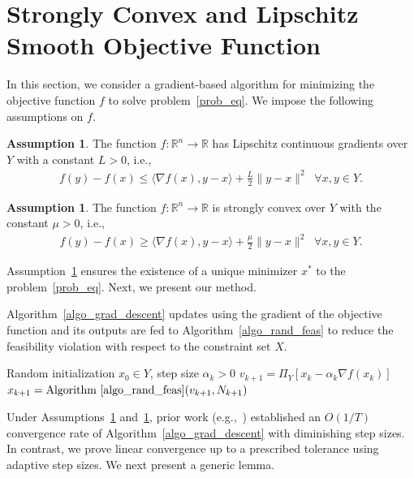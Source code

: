 \documentclass{article}
\def\la{\langle}
\def\ra{\rangle}
\def\a{\alpha}
\def\re{\mathbb{R}}
\theoremstyle{plain}
\theoremstyle{definition}
\newtheorem{assumption}[theorem]{Assumption}
\theoremstyle{remark}
\begin{document}

\section{Strongly Convex and Lipschitz Smooth Objective Function}\label{sec:StrongConvex}

In this section, we consider a gradient-based algorithm for minimizing the objective function $f$ to solve problem~\eqref{prob_eq}. We impose the following assumptions on $f$.
%
%
\begin{assumption}\label{asum_lipschitz}
    The function $f:\re^n\to\re$ has Lipschitz continuous gradients over $Y$ with a constant $L>0$, i.e.,
   \begin{align}
       f(y)-f(x)\le \la \nabla f(x),y-x\ra+\frac{L}{2}\|y-x\|^2 \;\; \forall x,y\in Y. \nonumber
   \end{align}
\end{assumption}
%
%
\begin{assumption}\label{asum_strong_convex}
    The function $f:\re^n\to\re$ is strongly convex
   over $Y$ with the constant $\mu>0$, i.e.,
   \begin{align}
       f(y)-f(x)\ge \la \nabla f(x),y-x\ra+\frac{\mu}{2}\|y-x\|^2 \;\; \forall x, y \in Y . \nonumber
   \end{align}
\end{assumption}
%
%
Assumption~\ref{asum_strong_convex} ensures the existence of a unique minimizer $x^*$ to the problem~\eqref{prob_eq}. Next, we present our method.

Algorithm~\ref{algo_grad_descent} updates using the gradient of the objective function and its outputs are fed to Algorithm~\ref{algo_rand_feas} to reduce the feasibility violation with respect to the constraint set $X$. 
%
%
\begin{algorithm}
\caption{Gradient Method with Randomized Feasibility}
\label{algo_grad_descent}
\begin{algorithmic}[1]
\REQUIRE Random initialization $x_0 \in Y$, step size $\a_k > 0$
    \STATE $v_{k+1} = \Pi_Y[x_k - \a_k \nabla f(x_k)]$
    \STATE $x_{k+1} = \text{Algorithm~\ref{algo_rand_feas}}(v_{k+1}, N_{k+1})$
\ENDFOR
\end{algorithmic}
\end{algorithm}
%
Under Assumptions~\ref{asum_lipschitz} and~\ref{asum_strong_convex}, prior work (e.g.,~\cite{nedic2019random}) established an $O(1/T)$ convergence rate of Algorithm~\ref{algo_grad_descent} with diminishing step sizes. In contrast, we prove linear convergence up to a prescribed tolerance using adaptive step sizes. We next present a generic lemma. %
\end{document}
